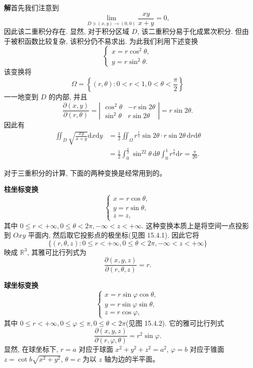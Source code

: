 \documentclass[UTF8, 12pt, fontset=fandol, oneside]{ctexart}
\begin{document}
\noindent\textbf{解}\quad 首先我们注意到
\[
  \lim_{D\ni(x,y)\to(0,0)}\frac{xy}{x+y}=0,
\]
因此该二重积分存在. 显然, 对于积分区域 $D$, 该二重积分易于化成累次积分. 但由于被积函数比较复杂, 该积分仍不易求出. 为此我们利用下述变换
\[
  \begin{cases}
    x=r\cos^2\theta,\\
    y=r\sin^2\theta.
  \end{cases}
\]
该变换将
\[
  \Omega=\left\{(r,\theta):0<r<1,0<\theta<\frac\pi2\right\}
\]
一一地变到 $D$ 的内部, 并且
\[
  \frac{\partial(x,y)}{\partial(r,\theta)}
  =\left|\begin{matrix}
    \cos^2\theta&-r\sin2\theta\\
    \sin^2\theta&r\sin2\theta
  \end{matrix}\right|
  =r\sin2\theta.
\]
因此有
\[
\begin{aligned}
  \iint_D\sqrt{\frac{xy}{x+y}}\mathrm dx\mathrm dy
  &=\frac12\iint_\Omega r^{\frac12}\sin2\theta\cdot r\sin2\theta\,\mathrm dr\mathrm d\theta\\
  &=\frac12\int_0^{\frac\pi2}\sin^22\theta\,\mathrm d\theta\int_0^1 r^{\frac32}\mathrm dr
  =\frac\pi{20}.
\end{aligned}
\]

对于三重积分的计算, 下面的两种变换是经常用到的。

\noindent\textbf{柱坐标变换}
\[
  \begin{cases}
    x=r\cos\theta,\\
    y=r\sin\theta,\\
    z=z,
  \end{cases}
\]
其中 $0\leqslant r<+\infty,0\leqslant\theta<2\pi,-\infty<z<+\infty$. 这种变换本质上是将空间一点投影到 $Oxy$ 平面内, 然后取它投影点的极坐标(见图 15.4.1). 因此它将
\[
  \{(r,\theta,z):0\leqslant r<+\infty,0\leqslant\theta<2\pi,-\infty<z<+\infty\}
\]
映成 $\mathbb R^3$, 其雅可比行列式为
\[
  \frac{\partial(x,y,z)}{\partial(r,\theta,z)}=r.
\]

\noindent\textbf{球坐标变换}
\[
  \begin{cases}
    x=r\sin\varphi\cos\theta,\\
    y=r\sin\varphi\sin\theta,\\
    z=r\cos\varphi,
  \end{cases}
\]
其中 $0\leqslant r<+\infty,0\leqslant\varphi\leqslant\pi,0\leqslant\theta<2\pi$(见图 15.4.2). 它的雅可比行列式
\[
  \frac{\partial(x,y,z)}{\partial(r,\varphi,\theta)}=r^2\sin\varphi.
\]
显然, 在球坐标下, $r=a$ 对应于球面 $x^2+y^2+z^2=a^2$, $\varphi=b$ 对应于锥面 $z=\cot b\sqrt{x^2+y^2}$, $\theta=c$ 为以 $z$ 轴为边的半平面。
\end{document}
